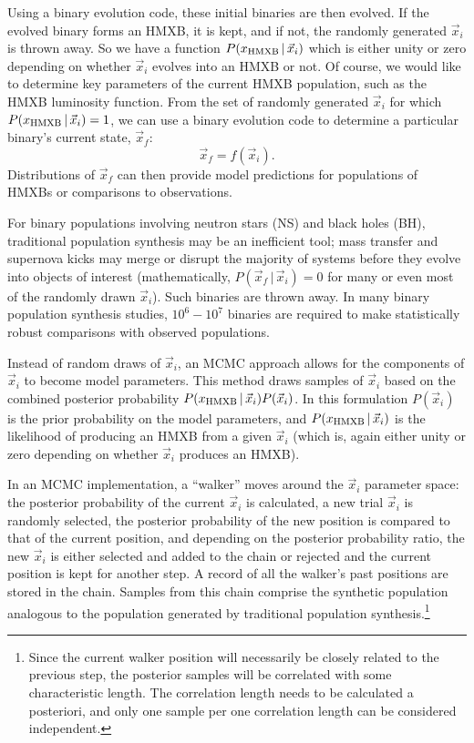 \documentclass[12pt, preprint]{aastex}
\newcommand{\given}{\,|\,}
\begin{document}
Using a binary evolution code, these initial binaries are then evolved. If the evolved binary forms an HMXB, it is kept, and if not, the randomly generated $\vec{x}_i$ is thrown away. So we have a function $P(x_{\rm HMXB} \given \vec{x}_i)$ which is either unity or zero depending on whether $\vec{x}_i$ evolves into an HMXB or not. Of course, we would like to determine key parameters of the current HMXB population, such as the HMXB luminosity function. From the set of randomly generated $\vec{x}_i$ for which $P(x_{\rm HMXB} \given \vec{x}_i)=1$, we can use a binary evolution code to determine a particular binary's current state, $\vec{x}_f$:
\begin{equation}
\vec{x}_f = f(\vec{x}_i).
\end{equation}
Distributions of $\vec{x}_f$ can then provide model predictions for populations of HMXBs or comparisons to observations.


For binary populations involving neutron stars (NS) and black holes (BH), traditional population synthesis may be an inefficient tool; mass transfer and supernova kicks may merge or disrupt the majority of systems before they evolve into objects of interest (mathematically, $P(\vec{x}_f \given \vec{x}_i) = 0$ for many or even most of the randomly drawn $\vec{x}_i$). Such binaries are thrown away. In many binary population synthesis studies, $10^6-10^7$ binaries are required to make statistically robust comparisons with observed populations.






Instead of random draws of $\vec{x}_i$, an MCMC approach allows for the components of $\vec{x}_i$ to become model parameters. This method draws samples of $\vec{x}_i$ based on the combined posterior probability $P(x_{\rm HMXB} \given \vec{x}_i) P(\vec{x}_i)$. In this formulation $P(\vec{x}_i)$ is the prior probability on the model parameters, and $P(x_{\rm HMXB} \given \vec{x}_i)$ is the likelihood of producing an HMXB from a given $\vec{x}_i$ (which is, again either unity or zero depending on whether $\vec{x}_i$ produces an HMXB). 


In an MCMC implementation, a ``walker'' moves around the $\vec{x}_i$ parameter space: the posterior probability of the current $\vec{x}_i$ is calculated, a new trial $\vec{x}_i$ is randomly selected, the posterior probability of the new position is compared to that of the current position, and depending on the posterior probability ratio, the new $\vec{x}_i$ is either selected and added to the chain or rejected and the current position is kept for another step. A record of all the walker's past positions are stored in the chain. Samples from this chain comprise the synthetic population analogous to the population generated by traditional population synthesis.\footnote{Since the current walker position will necessarily be closely related to the previous step, the posterior samples will be correlated with some characteristic length. The correlation length needs to be calculated a posteriori, and only one sample per one correlation length can be considered independent.}
\end{document}
